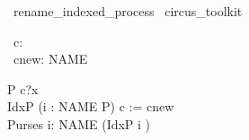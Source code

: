 \begin{zsection}
  \SECTION\ rename\_indexed\_process \parents\ circus\_toolkit
\end{zsection}

\begin{zed}
   [NAME]
\end{zed}

\begin{circus}
     \circchannel\ c: \nat \\
     \circchannel\ cnew: NAME \cross \nat
\end{circus}

\begin{circus}
   \circprocess P \circdef \circbegin \circspot c?x \then \Skip \circend \\
   \circprocess IdxP \circdef (i : NAME \circindex P) \lcircrename c := cnew \rcircrename \\
   \circprocess Purses \circdef \Interleave i: NAME \circspot (IdxP \lcircindex i \rcircindex)
\end{circus}

